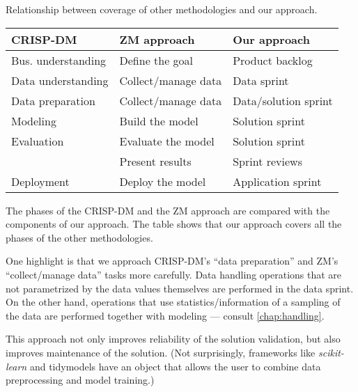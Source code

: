 \begin{tablebox}[label=tab:phases]{Relationship between coverage of other methodologies and our approach.}
  \centering
  \small %
  \begin{tabular}{lll}
    \toprule
    \textbf{CRISP-DM} & \textbf{ZM approach} & \textbf{Our approach} \\
    \midrule
    Bus. understanding & Define the goal & Product backlog \\
    Data understanding & Collect/manage data & Data sprint \\
    Data preparation & Collect/manage data & Data/solution sprint \\
    Modeling & Build the model & Solution sprint \\
    Evaluation & Evaluate the model & Solution sprint \\
    & Present results & Sprint reviews \\
    Deployment & Deploy the model & Application sprint \\
    \bottomrule
  \end{tabular}
  \tcblower
  The phases of the CRISP-DM and the ZM approach are compared with the components of our
  approach.  The table shows that our approach covers all the phases of the other
  methodologies.
\end{tablebox}

One highlight is that we approach CRISP-DM's ``data preparation'' and ZM's
``collect/manage data'' tasks more carefully.  Data handling operations that are not
parametrized by the data values themselves are performed in the data sprint.  On the other hand,
operations that use statistics/information of a sampling of the data are performed
together with modeling --- consult \cref{chap:handling}.

This approach not only improves reliability of the solution validation, but also improves
maintenance of the solution.  (Not surprisingly, frameworks like \textit{scikit-learn} and
tidymodels have an object that allows the user to combine data preprocessing and
model training.)


